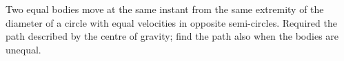 Two equal bodies move at the same instant from the same
extremity of the diameter of a circle with equal velocities
in opposite semi-circles. Required the path described by the 
centre of gravity; find the path also when the bodies are
unequal.
